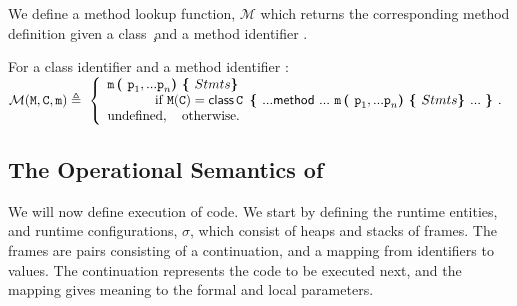 We define a method lookup function, $\mathcal{M}$ which returns the corresponding method definition given a class \c\ and a method identifier \m.


 \begin{definition}[Lookup] For a class identifier   and a method identifier  : $ ~ $ \\

\noindent
$
\Meths {} {\prg{C}} {m}       \triangleq  \ \left\{
\begin{array}{l}
                        \m\, \lp \p_1, ... \p_n \rp \lb Stmts   \rb\\
\hspace{0.5in} \mbox{if}\  \M(\prg{C}) =   \kwN{class}\, \prg{C}\, \  \lb ...   \kwN{method}\ ...\  \m\, \lp \p_1, ... \p_n \rp \lb Stmts  \rb  ... \ \rb.
\\
\mbox{undefined},  \ \ \ \mbox{otherwise.}
\end{array}
                    \right.$

  \end{definition}

\subsection{The Operational Semantics of \LangOO}
\label{formal:semantics}

We will now define execution of \LangOO code.
We start by  defining the  runtime entities, and runtime configurations, $\sigma$, which consist of heaps and stacks of frames.
 The frames are pairs consisting of a continuation, and a mapping from identifiers to values.
The continuation represents the code to be executed next, and the mapping gives meaning
to the formal and local parameters.

